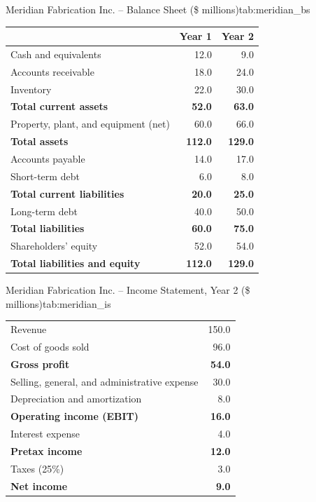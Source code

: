\documentclass[../ai_in_finance]{subfiles}
\begin{document}
\begin{booktable}[htbp]{Meridian Fabrication Inc. -- Balance Sheet (\$ millions)}{tab:meridian_bs}
\begin{tabular}{lrr}
\toprule
 & Year 1 & Year 2 \\
\midrule
Cash and equivalents            & 12.0 & 9.0 \\
Accounts receivable             & 18.0 & 24.0 \\
Inventory                       & 22.0 & 30.0 \\
\textbf{Total current assets}   & \textbf{52.0} & \textbf{63.0} \\
Property, plant, and equipment (net) & 60.0 & 66.0 \\
\textbf{Total assets}           & \textbf{112.0} & \textbf{129.0} \\
\midrule
Accounts payable                & 14.0 & 17.0 \\
Short-term debt                 & 6.0  & 8.0 \\
\textbf{Total current liabilities} & \textbf{20.0} & \textbf{25.0} \\
Long-term debt                  & 40.0 & 50.0 \\
\textbf{Total liabilities}      & \textbf{60.0} & \textbf{75.0} \\
Shareholders' equity            & 52.0 & 54.0 \\
\textbf{Total liabilities and equity} & \textbf{112.0} & \textbf{129.0} \\
\bottomrule
\end{tabular}
\end{booktable}

\begin{booktable}[htbp]{Meridian Fabrication Inc. -- Income Statement, Year 2 (\$ millions)}{tab:meridian_is}
\begin{tabular}{lr}
\toprule
Revenue                          & 150.0 \\
Cost of goods sold               & 96.0 \\
\textbf{Gross profit}            & \textbf{54.0} \\
Selling, general, and administrative expense & 30.0 \\
Depreciation and amortization    & 8.0 \\
\textbf{Operating income (EBIT)} & \textbf{16.0} \\
Interest expense                 & 4.0 \\
\textbf{Pretax income}           & \textbf{12.0} \\
Taxes (25\%)                     & 3.0 \\
\textbf{Net income}              & \textbf{9.0} \\
\bottomrule
\end{tabular}
\end{booktable}
\end{document}
